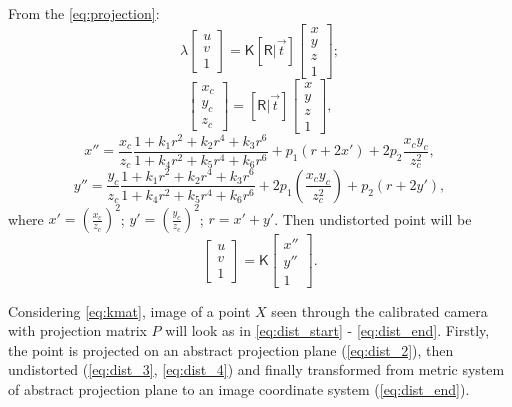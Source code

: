 From the \autoref{eq:projection}:
\begin{equation}
    \label{eq:dist_start}
    \lambda \begin{bmatrix} 
        u \\ v \\ 1 \end{bmatrix} = \pmb{\mathsf{K}} [\pmb{\mathsf{R}} | \vec{t}] \begin{bmatrix} x \\ y \\ z \\ 1
    \end{bmatrix};
\end{equation}
\begin{equation}
    \label{eq:dist_2}
    \begin{bmatrix} x_c \\ y_c \\ z_c \end{bmatrix}
     = [\pmb{\mathsf{R}} | \vec{t}] \begin{bmatrix} x \\ y \\ z \\ 1
    \end{bmatrix},
\end{equation}
\begin{equation}
    \label{eq:dist_3}
    x'' = \frac{x_c}{z_c} \frac{1 + k_1r^2 + k_2r^4 + k_3r^6}{1 + k_4r^2 + k_5r^4 + k_6r^6} + p_1(r + 2x') + 2p_2\frac{x_c y_c}{z^2_c},
\end{equation}
\begin{equation}
    \label{eq:dist_4}
    y'' = \frac{y_c}{z_c} \frac{1 + k_1r^2 + k_2r^4 + k_3r^6}{1 + k_4r^2 + k_5r^4 + k_6r^6} + 2p_1(\frac{x_c y_c}{z_c^2}) + p_2(r + 2y'),
\end{equation}
where $x' = (\frac{x_c}{z_c})^2$; $y' = (\frac{y_c}{z_c})^2$; $r = x' + y'$. Then undistorted point will be
\begin{equation}
    \label{eq:dist_end}
    \begin{bmatrix} u \\ v \\ 1 \end{bmatrix} = \pmb{\mathsf{K}} \begin{bmatrix} x'' \\ y'' \\ 1 \end{bmatrix}.
\end{equation}

Considering \autoref{eq:kmat}, image of a point $X$ seen through the calibrated camera with projection matrix $P$ will look as in \autoref{eq:dist_start} - \autoref{eq:dist_end}. Firstly, the point is projected on an abstract projection plane (\autoref{eq:dist_2}), then undistorted (\autoref{eq:dist_3}, \autoref{eq:dist_4}) and finally transformed from metric system of abstract projection plane to an image coordinate system (\autoref{eq:dist_end}).

